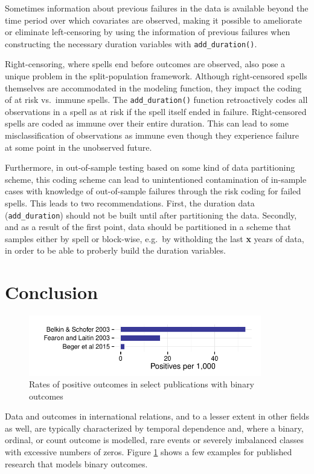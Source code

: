 \documentclass[article]{jss}
\begin{document}
Sometimes information about previous failures in the data is available
beyond the time period over which covariates are observed, making it
possible to ameliorate or eliminate left-censoring by using the
information of previous failures when constructing the necessary
duration variables with \texttt{add\_duration()}.

Right-censoring, where spells end before outcomes are observed, also
pose a unique problem in the split-population framework. Although
right-censored spells themselves are accommodated in the modeling
function, they impact the coding of at risk vs.~immune spells. The
\texttt{add\_duration()} function retroactively codes all observations
in a spell as at risk if the spell itself ended in failure.
Right-censored spells are coded as immune over their entire duration.
This can lead to some misclassification of observations as immune even
though they experience failure at some point in the unobserved future.

Furthermore, in out-of-sample testing based on some kind of data
partitioning scheme, this coding scheme can lead to unintentioned
contamination of in-sample cases with knowledge of out-of-sample
failures through the risk coding for failed spells. This leads to two
recommendations. First, the duration data (\texttt{add\_duration})
should not be built until after partitioning the data. Secondly, and as
a result of the first point, data should be partitioned in a scheme that
samples either by spell or block-wise, e.g.~by witholding the last
\textbf{x} years of data, in order to be able to proberly build the
duration variables.

\section{Conclusion}\label{conclusion}

\begin{figure}[htbp!]
\centering
\includegraphics[width = 4in]{graphics/rates.pdf}
\caption{Rates of positive outcomes in select publications with binary outcomes}
\label{rates}
\end{figure}

Data and outcomes in international relations, and to a lesser extent in
other fields as well, are typically characterized by temporal dependence
and, where a binary, ordinal, or count outcome is modelled, rare events
or severely imbalanced classes with excessive numbers of zeros. Figure
\ref{rates} shows a few examples for published research that models
binary outcomes.
\end{document}
